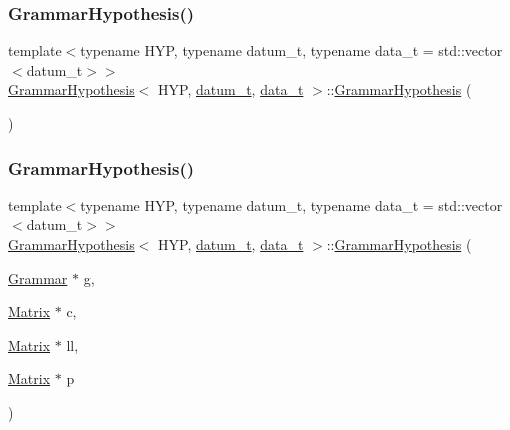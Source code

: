 \subsubsection{\texorpdfstring{Grammar\+Hypothesis()}{GrammarHypothesis()}\hspace{0.1cm}{\footnotesize\ttfamily [1/2]}}
{\footnotesize\ttfamily template$<$typename H\+YP, typename datum\+\_\+t, typename data\+\_\+t = std\+::vector$<$datum\+\_\+t$>$$>$ \\
\hyperlink{class_grammar_hypothesis}{Grammar\+Hypothesis}$<$ H\+YP, \hyperlink{class_bayesable_a9f1a6c0cd7855550fa10b1a8f13a5867}{datum\+\_\+t}, \hyperlink{class_bayesable_aa2788c4d7718c0a824e1d28c4c98f921}{data\+\_\+t} $>$\+::\hyperlink{class_grammar_hypothesis}{Grammar\+Hypothesis} (\begin{DoxyParamCaption}{ }\end{DoxyParamCaption})\hspace{0.3cm}{\ttfamily [inline]}}

\mbox{\label{class_grammar_hypothesis_aef570b3ee4d74cb98ab9db5089fc901c}} 
\subsubsection{\texorpdfstring{Grammar\+Hypothesis()}{GrammarHypothesis()}\hspace{0.1cm}{\footnotesize\ttfamily [2/2]}}
{\footnotesize\ttfamily template$<$typename H\+YP, typename datum\+\_\+t, typename data\+\_\+t = std\+::vector$<$datum\+\_\+t$>$$>$ \\
\hyperlink{class_grammar_hypothesis}{Grammar\+Hypothesis}$<$ H\+YP, \hyperlink{class_bayesable_a9f1a6c0cd7855550fa10b1a8f13a5867}{datum\+\_\+t}, \hyperlink{class_bayesable_aa2788c4d7718c0a824e1d28c4c98f921}{data\+\_\+t} $>$\+::\hyperlink{class_grammar_hypothesis}{Grammar\+Hypothesis} (\begin{DoxyParamCaption}\item[{\hyperlink{class_grammar}{Grammar} $\ast$}]{g,  }\item[{\hyperlink{_eigen_numerics_8h_a645222978e81acfb2523a9bce34aecc0}{Matrix} $\ast$}]{c,  }\item[{\hyperlink{_eigen_numerics_8h_a645222978e81acfb2523a9bce34aecc0}{Matrix} $\ast$}]{ll,  }\item[{\hyperlink{_eigen_numerics_8h_a645222978e81acfb2523a9bce34aecc0}{Matrix} $\ast$}]{p }\end{DoxyParamCaption})\hspace{0.3cm}{\ttfamily [inline]}}



